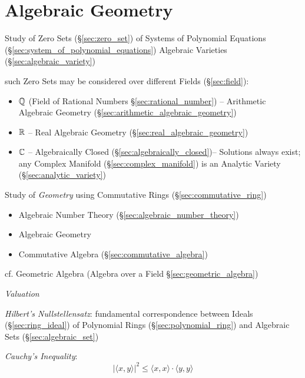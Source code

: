 \part{Algebraic Geometry}\label{part:algebraic_geometry}

Study of Zero Sets (\S\ref{sec:zero_set}) of Systems of Polynomial Equations
(\S\ref{sec:system_of_polynomial_equations}) \fist Algebraic Varieties
(\S\ref{sec:algebraic_variety})

such Zero Sets may be considered over different Fields (\S\ref{sec:field}):
\begin{itemize}
  \item $\mathbb{Q}$ (Field of Rational Numbers \S\ref{sec:rational_number}) --
    Arithmetic Algebraic Geometry (\S\ref{sec:arithmetic_algebraic_geometry})
  \item $\mathbb{R}$ -- Real Algebraic Geometry
    (\S\ref{sec:real_algebraic_geometry})
  \item $\mathbb{C}$ -- Algebraically Closed (\S\ref{sec:algebraically_closed})--
    Solutions always exist; any Complex Manifold (\S\ref{sec:complex_manifold})
    is an Analytic Variety (\S\ref{sec:analytic_variety})
\end{itemize}

Study of \emph{Geometry} using Commutative Rings (\S\ref{sec:commutative_ring})

\begin{itemize}
  \item Algebraic Number Theory (\S\ref{sec:algebraic_number_theory})
  \item Algebraic Geometry
  \item Commutative Algebra (\S\ref{sec:commutative_algebra})
\end{itemize}

cf. Geometric Algebra (Algebra over a Field \S\ref{sec:geometric_algebra})

\emph{Valuation}

\emph{Hilbert's Nullstellensatz}: fundamental correspondence between Ideals
(\S\ref{sec:ring_ideal}) of Polynomial Rings (\S\ref{sec:polynomial_ring}) and
Algebraic Sets (\S\ref{sec:algebraic_set})

\emph{Cauchy's Inequality}:
\[
    |\langle x,y \rangle|^2 \leq \langle x,x \rangle \cdot \langle
    y,y \rangle
\]

